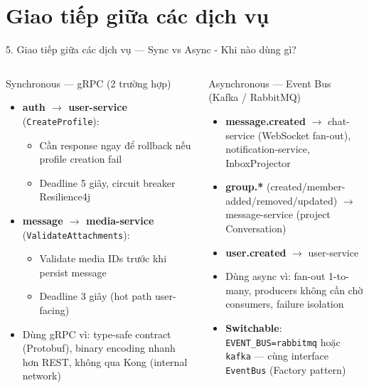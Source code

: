 \documentclass[aspectratio=169,compress]{beamer}
\begin{document}
\section{Giao tiếp giữa các dịch vụ}

\begin{frame}{5. Giao tiếp giữa các dịch vụ --- Sync vs Async - Khi nào dùng gì?}
\begin{columns}[T]
\begin{block}{Synchronous --- gRPC (2 trường hợp)}
\footnotesize
\begin{itemize}
  \item \textbf{auth $\rightarrow$ user-service} (\texttt{CreateProfile}):
    \begin{itemize}
      \item Cần response ngay để rollback nếu profile creation fail
      \item Deadline 5 giây, circuit breaker Resilience4j
    \end{itemize}
  \item \textbf{message $\rightarrow$ media-service} (\texttt{ValidateAttachments}):
    \begin{itemize}
      \item Validate media IDs trước khi persist message
      \item Deadline 3 giây (hot path user-facing)
    \end{itemize}
  \item Dùng gRPC vì: type-safe contract (Protobuf), binary encoding nhanh hơn REST, không qua Kong (internal network)
\end{itemize}
\end{block}

\begin{block}{Asynchronous --- Event Bus (Kafka / RabbitMQ)}
\footnotesize
\begin{itemize}
  \item \textbf{message.created} $\rightarrow$ chat-service (WebSocket fan-out), notification-service, InboxProjector
  \item \textbf{group.*} (created/member-added/removed/updated) $\rightarrow$ message-service (project Conversation)
  \item \textbf{user.created} $\rightarrow$ user-service
  \item Dùng async vì: fan-out 1-to-many, producers không cần chờ consumers, failure isolation
  \item \textbf{Switchable}: \texttt{EVENT\_BUS=rabbitmq} hoặc \texttt{kafka} --- cùng interface \texttt{EventBus} (Factory pattern)
\end{itemize}
\end{block}
\end{columns}
\end{frame}
\end{document}
